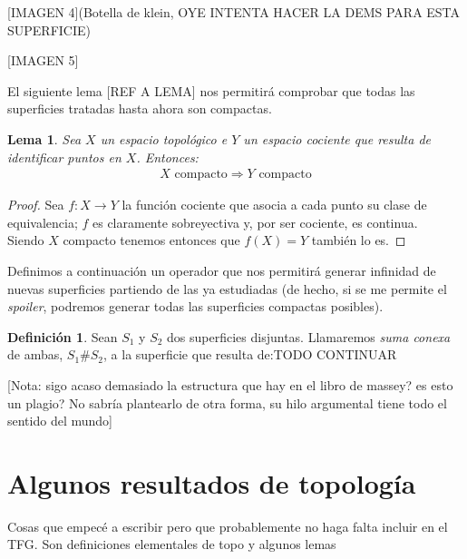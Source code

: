 \documentclass[a4paper,11pt,spanish, twoside, leqno]{tfg-uam}
\newtheorem{lema}[teor]{Lema}
\theoremstyle{definition}
\newtheorem{defin}[teor]{Definici\'on}
\begin{document}
[IMAGEN 4](Botella de klein, OYE INTENTA HACER LA DEMS PARA ESTA SUPERFICIE)

[IMAGEN 5]

El siguiente lema [REF A LEMA] nos permitirá comprobar que todas las superficies tratadas hasta ahora son compactas.

\begin{lema}
	Sea $X$ un espacio topológico e $Y$  un espacio cociente que resulta de identificar puntos en $X$. Entonces:
	\begin{align*}
	\text{$X$ compacto}\Rightarrow\text{$Y$ compacto}
	\end{align*}
\end{lema}
\begin{proof}
	Sea $f:X\longrightarrow Y$ la función cociente que asocia a cada punto su clase de equivalencia; $f$ es claramente sobreyectiva y, por ser cociente, es continua.\\
	Siendo $X$ compacto tenemos entonces que $f(X)=Y$ también lo es.
\end{proof}



Definimos a continuación un operador que nos permitirá generar infinidad de nuevas superficies partiendo de las ya estudiadas (de hecho, si se me permite el \textit{spoiler}, podremos generar todas las superficies compactas posibles).


\begin{defin}
	Sean $S_1$ y $S_2$ dos superficies disjuntas. Llamaremos \textit{suma conexa} de ambas, $S_1\#S_2$, a la superficie que resulta de:TODO CONTINUAR
\end{defin}

[Nota: sigo acaso demasiado la estructura que hay en el libro de massey? es esto un plagio? No sabría plantearlo de otra forma, su hilo argumental tiene todo el sentido del mundo]




\chapter{Algunos resultados de topología}
Cosas que empecé a escribir pero que probablemente no haga falta incluir en el TFG. Son definiciones elementales de topo y algunos lemas
\end{document}
